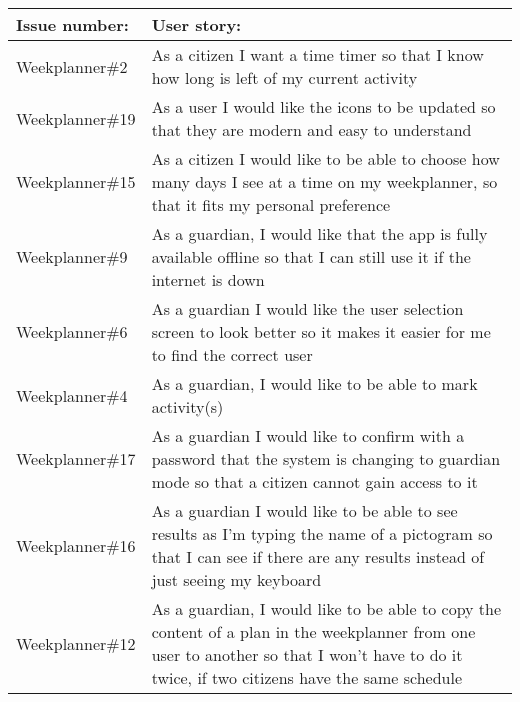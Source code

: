 \begin{table}[tbp]
    \begin{tabular}{|p{}|p{}|}
    \hline
    Issue number:    & User story:                                                                                                                                                                                  \\ \hline
    Weekplanner\#2  & As a citizen I want a time timer so that I know how long is left of my current activity                                                                                                      \\ \hline
    Weekplanner\#19 & As a user I would like the icons to be updated so that they are modern and easy to understand                                                                                                \\ \hline
    Weekplanner\#15 & As a citizen I would like to be able to choose how many days I see at a time on my weekplanner, so that it fits my personal preference                                                       \\ \hline
    Weekplanner\#9  & As a guardian, I would like that the app is fully available offline so that I can still use it if the internet is down                                                                       \\ \hline
    Weekplanner\#6  & As a guardian I would like the user selection screen to look better so it makes it easier for me to find the correct user                                                                    \\ \hline
    Weekplanner\#4  & As a guardian, I would like to be able to mark activity(s)                                                                                                                                   \\ \hline
    Weekplanner\#17 & As a guardian I would like to confirm with a password that the system is changing to guardian mode so that a citizen cannot gain access to it                                                \\ \hline
    Weekplanner\#16 & As a guardian I would like to be able to see results as I'm typing the name of a pictogram so that I can see if there are any results instead of just seeing my keyboard                     \\ \hline
    Weekplanner\#12 & As a guardian, I would like to be able to copy the content of a plan in the weekplanner from one user to another so that I won't have to do it twice, if two citizens have the same schedule \\ \hline

\end{tabular}
\end{table}
